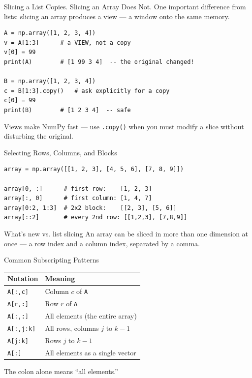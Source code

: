 \documentclass[9pt,aspectratio=169,xcolor=table]{beamer}
\newcommand{\striped}{\rowcolors{1}{white}{stripe}}
\begin{document}
\begin{frame}[fragile]{Slicing a List Copies. Slicing an Array Does Not.}
    \leavevmode
    \alert{One important difference from lists}: slicing an array
    produces a \alert{view} --- a window onto the same memory.

\begin{lstlisting}
A = np.array([1, 2, 3, 4])
v = A[1:3]      # a VIEW, not a copy
v[0] = 99
print(A)        # [1 99 3 4]  -- the original changed!

B = np.array([1, 2, 3, 4])
c = B[1:3].copy()   # ask explicitly for a copy
c[0] = 99
print(B)        # [1 2 3 4]  -- safe
\end{lstlisting}

    \vspace{1mm}
    {\small Views make NumPy fast --- use \texttt{.copy()} when you must
    modify a slice without disturbing the original.}
\end{frame}

\begin{frame}[fragile]{Selecting Rows, Columns, and Blocks}
    \leavevmode
\begin{lstlisting}
array = np.array([[1, 2, 3], [4, 5, 6], [7, 8, 9]])

array[0, :]      # first row:    [1, 2, 3]
array[:, 0]      # first column: [1, 4, 7]
array[0:2, 1:3]  # 2x2 block:    [[2, 3], [5, 6]]
array[::2]       # every 2nd row: [[1,2,3], [7,8,9]]
\end{lstlisting}

    \vspace{2mm}
    \begin{block}{What's new vs. list slicing}
        An array can be sliced in \alert{more than one dimension at
        once} --- a row index and a column index, separated by a comma.
    \end{block}
\end{frame}

\begin{frame}{Common Subscripting Patterns}
    \leavevmode
    \small
    \striped
    \begin{center}
    \begin{tabular}{lp{7.2cm}}
        \toprule
        \textbf{Notation} & \textbf{Meaning} \\
        \midrule
        \texttt{A[:,c]} & Column $c$ of \texttt{A} \\
        \texttt{A[r,:]} & Row $r$ of \texttt{A} \\
        \texttt{A[:,:]} & All elements (the entire array) \\
        \texttt{A[:,j:k]} & All rows, columns $j$ to $k-1$ \\
        \texttt{A[j:k]} & Rows $j$ to $k-1$ \\
        \texttt{A[:]} & All elements as a single vector \\
        \bottomrule
    \end{tabular}
    \end{center}

    \vspace{3mm}
    {\small The colon alone means ``all elements.''}
\end{frame}
\end{document}
